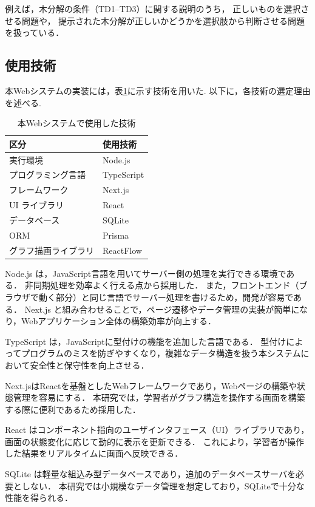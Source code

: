 \documentclass[technicalreport]{ieicej}
\begin{document}
例えば，木分解の条件（TD1--TD3）に関する説明のうち，
正しいものを選択させる問題や，
提示された木分解が正しいかどうかを選択肢から判断させる問題を扱っている．

\subsection{使用技術}
本Webシステムの実装には，表\ref{tab:tech}に示す技術を用いた. 
以下に，各技術の選定理由を述べる.
\begin{table}[h]
  \centering
  \caption{本Webシステムで使用した技術}
  \label{tab:tech}
  \begin{tabular}{ll}
    \hline
    区分 & 使用技術 \\ \hline
    実行環境 & Node.js \\
    プログラミング言語 & TypeScript \\
    フレームワーク & Next.js \\
    UI ライブラリ & React \\
    データベース & SQLite \\
    ORM & Prisma \\
    グラフ描画ライブラリ & ReactFlow \\
    \hline
  \end{tabular}
\end{table}

Node.js\cite{nodejs} は，JavaScript言語を用いてサーバー側の処理を実行できる環境である．
非同期処理を効率よく行える点から採用した．
また，フロントエンド（ブラウザで動く部分）と同じ言語でサーバー処理を書けるため，開発が容易である．
Next.js\cite{Next.js} と組み合わせることで，ページ遷移やデータ管理の実装が簡単になり，Webアプリケーション全体の構築効率が向上する．

TypeScript\cite{TypeScript} は，JavaScriptに型付けの機能を追加した言語である．
型付けによってプログラムのミスを防ぎやすくなり，複雑なデータ構造を扱う本システムにおいて安全性と保守性を向上させる．

Next.jsはReact\cite{React,React/Next.js,React2025,Webprogramming}を基盤としたWebフレームワークであり，Webページの構築や状態管理を容易にする．
本研究では，学習者がグラフ構造を操作する画面を構築する際に便利であるため採用した．

React はコンポーネント指向のユーザインタフェース（UI）ライブラリであり，
画面の状態変化に応じて動的に表示を更新できる．
これにより，学習者が操作した結果をリアルタイムに画面へ反映できる．

SQLite\cite{sqlite} は軽量な組込み型データベースであり，追加のデータベースサーバを必要としない．
本研究では小規模なデータ管理を想定しており，SQLiteで十分な性能を得られる．
\end{document}
